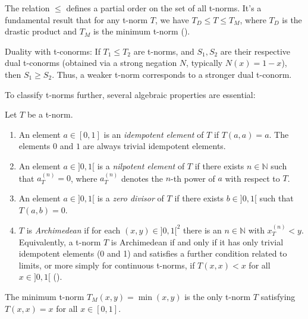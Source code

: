 \begin{remark}
  The relation $\leq$ defines a partial order on the set of all t-norms.
  It's a fundamental result that for any t-norm $T$, we have $T_D \leq T \leq T_M$, where $T_D$ is the drastic product and $T_M$ is the minimum t-norm (\citep[Remark 1.5(i), p.~21]{Klement2000}).
\end{remark}

\begin{remark}
  Duality with t-conorms: If $T_1 \leq T_2$ are t-norms, and $S_1, S_2$ are their respective dual t-conorms (obtained via a strong negation $N$, typically $N(x)=1-x$), then $S_1 \geq S_2$. Thus, a weaker t-norm corresponds to a stronger dual t-conorm.
\end{remark}

To classify t-norms further, several algebraic properties are essential:

\begin{definition}
Let $T$ be a t-norm.
\begin{enumerate}
    \item An element $a \in [0,1]$ is an \emph{idempotent element} of $T$ if $T(a,a)=a$. The elements $0$ and $1$ are always trivial idempotent elements.
    \item An element $a \in ]0,1[$ is a \emph{nilpotent element} of $T$ if there exists $n \in \mathbb{N}$ such that $a_T^{(n)} = 0$, where $a_T^{(n)}$ denotes the $n$-th power of $a$ with respect to $T$.
    \item An element $a \in ]0,1[$ is a \emph{zero divisor} of $T$ if there exists $b \in ]0,1[$ such that $T(a,b)=0$.
    \item $T$ is \emph{Archimedean} if for each $(x,y) \in ]0,1[^2$ there is an $n \in \mathbb{N}$ with $x_T^{(n)} < y$. Equivalently, a t-norm $T$ is Archimedean if and only if it has only trivial idempotent elements (0 and 1) and satisfies a further condition related to limits, or more simply for continuous t-norms, if $T(x,x) < x$ for all $x \in ]0,1[$ (\citep[Theorem 2.12 and Theorem 5.1]{Klement2000}).
\end{enumerate}
\end{definition}

\begin{proposition}
  The minimum t-norm $T_M(x,y) = \min(x,y)$ is the only t-norm $T$ satisfying $T(x,x)=x$ for all $x \in [0,1]$.
\end{proposition}

